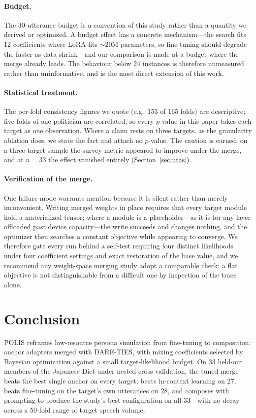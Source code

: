 \documentclass[11pt,letterpaper]{article}
\begin{document}
\paragraph{Budget.} The 30-utterance budget is a convention of this study rather than a quantity we derived or optimized. A budget effect has a concrete mechanism---the search fits 12 coefficients where LoRA fits ${\sim}20$M parameters, so fine-tuning should degrade the faster as data shrink---and our comparison is made at a budget where the merge already leads. The behaviour below 24 instances is therefore unmeasured rather than uninformative, and is the most direct extension of this work.

\paragraph{Statistical treatment.} The per-fold consistency figures we quote (e.g.\ 153 of 165 folds) are descriptive; five folds of one politician are correlated, so every $p$-value in this paper takes each target as one observation. Where a claim rests on three targets, as the granularity ablation does, we state the fact and attach no $p$-value. The caution is earned: on a three-target sample the survey metric appeared to improve under the merge, and at $n=33$ the effect vanished entirely (Section~\ref{sec:utas}).

\paragraph{Verification of the merge.} One failure mode warrants mention because it is silent rather than merely inconvenient. Writing merged weights in place requires that every target module hold a materialized tensor; where a module is a placeholder---as it is for any layer offloaded past device capacity---the write succeeds and changes nothing, and the optimizer then searches a constant objective while appearing to converge. We therefore gate every run behind a self-test requiring four distinct likelihoods under four coefficient settings and exact restoration of the base value, and we recommend any weight-space merging study adopt a comparable check: a flat objective is not distinguishable from a difficult one by inspection of the trace alone.

\section{Conclusion}
POLIS reframes low-resource persona simulation from fine-tuning to composition: anchor adapters merged with DARE-TIES, with mixing coefficients selected by Bayesian optimization against a small target-likelihood budget. On 33 held-out members of the Japanese Diet under nested cross-validation, the tuned merge beats the best single anchor on every target, beats in-context learning on 27, beats fine-tuning on the target's own utterances on 28, and composes with prompting to produce the study's best configuration on all 33---with no decay across a 50-fold range of target speech volume.
\end{document}
